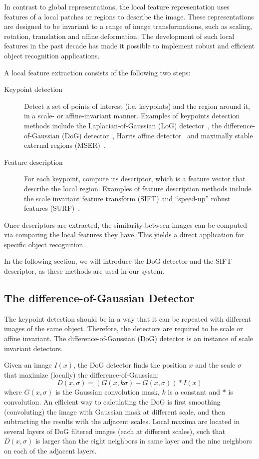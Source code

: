 \documentclass[12pt,final,twoside]{report}
\begin{document}
In contrast to global representations, the local feature representation uses features of a local patches or regions to describe the image. These representations are designed to be invariant to a range of image transformations, such as scaling, rotation, translation and affine deformation. The development of such local features in the past decade has made it possible to implement robust and efficient object recognition applications.

A local feature extraction consists of the following two steps: 
\begin{description}
  \item[Keypoint detection] Detect a set of points of interest (i.e. keypoints) and the region around it, in a scale- or affine-invariant manner. Examples of keypoints detection methods include the Laplacian-of-Gaussian (LoG) detector~\cite{lindeberg_feature_1998}, the difference-of-Gaussian (DoG) detector~\cite{lowe_object_1999}, Harris affine detector~\cite{mikolajczyk_scale_2004} and maximally stable external regions (MSER)~\cite{matas_robust_2004}. 
  \item[Feature description] For each keypoint, compute its descriptor, which is a feature vector that describe the local region. Examples of feature description methods include the scale invariant feature transform (SIFT) and ``speed-up'' robust features (SURF)~\cite{bay_speeded-up_2008}.
\end{description}

Once descriptors are extracted, the similarity between images can be computed via comparing the local features they have. This yields a direct application for specific object recognition.

In the following section, we will introduce the DoG detector and the SIFT descriptor, as these methods are used in our system.

\subsection{The difference-of-Gaussian Detector}
The keypoint detection should be in a way that it can be repeated with different images of the same object. Therefore, the detectors are required to be scale or affine invariant. The difference-of-Gaussian (DoG) detector is an instance of scale invariant detectors.

Given an image $I(x)$, the DoG detector finds the position $x$ and the scale $\sigma$ that maximize (locally) the difference-of-Gaussian:
\begin{equation}
  D(x,\sigma) = (G(x,k\sigma) - G(x,\sigma)) * I(x)
\end{equation}
where $G(x,\sigma)$ is the Gaussian convolution mask, $k$ is a constant and $*$ is convolution. An efficient way to calculating the DoG is first smoothing (convoluting) the image with Gaussian mask at different scale, and then subtracting the results with the adjacent scales. Local maxima are located in several layers of DoG filtered images (each at different scales), such that $D(x,\sigma)$ is larger than the eight neighbors in same layer and the nine neighbors on each of the adjacent layers.
\end{document}
